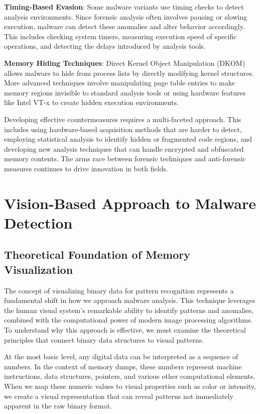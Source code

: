 \textbf{Timing-Based Evasion}: Some malware variants use timing checks to detect analysis environments. Since forensic analysis often involves pausing or slowing execution, malware can detect these anomalies and alter behavior accordingly. This includes checking system timers, measuring execution speed of specific operations, and detecting the delays introduced by analysis tools.

\textbf{Memory Hiding Techniques}: Direct Kernel Object Manipulation (DKOM) allows malware to hide from process lists by directly modifying kernel structures. More advanced techniques involve manipulating page table entries to make memory regions invisible to standard analysis tools or using hardware features like Intel VT-x to create hidden execution environments.

Developing effective countermeasures requires a multi-faceted approach. This includes using hardware-based acquisition methods that are harder to detect, employing statistical analysis to identify hidden or fragmented code regions, and developing new analysis techniques that can handle encrypted and obfuscated memory contents. The arms race between forensic techniques and anti-forensic measures continues to drive innovation in both fields.

\section{Vision-Based Approach to Malware Detection}
\label{sec:vision_approach}

\subsection{Theoretical Foundation of Memory Visualization}
\label{subsec:visualization_theory}

The concept of visualizing binary data for pattern recognition represents a fundamental shift in how we approach malware analysis. This technique leverages the human visual system's remarkable ability to identify patterns and anomalies, combined with the computational power of modern image processing algorithms. To understand why this approach is effective, we must examine the theoretical principles that connect binary data structures to visual patterns.

At the most basic level, any digital data can be interpreted as a sequence of numbers. In the context of memory dumps, these numbers represent machine instructions, data structures, pointers, and various other computational elements. When we map these numeric values to visual properties such as color or intensity, we create a visual representation that can reveal patterns not immediately apparent in the raw binary format.

